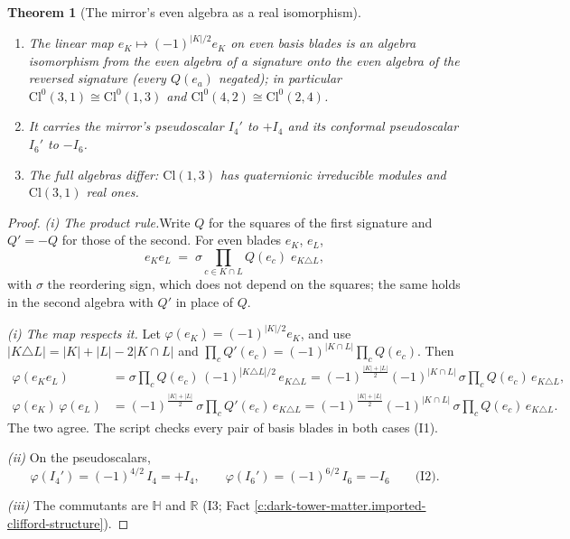 \documentclass[11pt]{article}
\newtheorem{theorem}{Theorem}[section]
\theoremstyle{definition}
\theoremstyle{plain}
\newcommand{\changedmark}[2]{\marginpar{\raggedright\scriptsize\color{#1}#2}}
\providecommand{\Cl}{}\renewcommand{\Cl}{\mathrm{Cl}}
\providecommand{\HH}{}\renewcommand{\HH}{\mathbb{H}}
\providecommand{\R}{}\renewcommand{\R}{\mathbb{R}}
\begin{document}
\begin{theorem}[The mirror's even algebra as a real isomorphism]\label{c:dark-tower-matter.mirror-algebra}
\changedmark{BurntOrange}{changed since the deposit}
\begin{enumerate}
\item[(i)] The linear map $e_{K} \mapsto (-1)^{|K|/2}e_{K}$ on even basis blades is an algebra isomorphism from the even algebra of a signature onto the even algebra of the reversed signature (every $Q(e_{a})$ negated); in particular $\Cl^{0}(3,1) \cong \Cl^{0}(1,3)$ and $\Cl^{0}(4,2) \cong \Cl^{0}(2,4)$.
\item[(ii)] It carries the mirror's pseudoscalar $I_{4}'$ to $+I_{4}$ and its conformal pseudoscalar $I_{6}'$ to $-I_{6}$.
\item[(iii)] The full algebras differ: $\Cl(1,3)$ has quaternionic irreducible modules and $\Cl(3,1)$ real ones.
\end{enumerate}
\end{theorem}
\begin{proof}
\textit{(i) The product rule.}\enspace Write $Q$ for the squares of the first signature and $Q' = -Q$ for those of the second. For even blades $e_{K}$, $e_{L}$,
\[
e_{K}e_{L} \;=\; \sigma \prod_{c \in K \cap L}Q(e_{c})\;e_{K \triangle L},
\]
with $\sigma$ the reordering sign, which does not depend on the squares; the same holds in the second algebra with $Q'$ in place of $Q$.



\emph{(i) The map respects it.}  Let $\varphi(e_{K}) = (-1)^{|K|/2}e_{K}$, and use $|K \triangle L| = |K| + |L| - 2|K \cap L|$ and $\prod_{c}Q'(e_{c}) = (-1)^{|K \cap L|}\prod_{c}Q(e_{c})$. Then
\begin{align*}
\varphi(e_{K}e_{L}) &= \sigma\prod_{c}Q(e_{c})\,(-1)^{|K \triangle L|/2}\,e_{K \triangle L}
= (-1)^{\frac{|K|+|L|}{2}}(-1)^{|K \cap L|}\,\sigma\prod_{c}Q(e_{c})\,e_{K \triangle L}, \\
\varphi(e_{K})\,\varphi(e_{L}) &= (-1)^{\frac{|K|+|L|}{2}}\,\sigma\prod_{c}Q'(e_{c})\,e_{K \triangle L}
= (-1)^{\frac{|K|+|L|}{2}}(-1)^{|K \cap L|}\,\sigma\prod_{c}Q(e_{c})\,e_{K \triangle L}.
\end{align*}
The two agree. The script checks every pair of basis blades in both cases (I1).



\emph{(ii)}  On the pseudoscalars,
\[
\varphi(I_{4}') = (-1)^{4/2}\,I_{4} = +I_{4}, \qquad \varphi(I_{6}') = (-1)^{6/2}\,I_{6} = -I_{6} \qquad \text{(I2)}.
\]



\emph{(iii)}  The commutants are $\HH$ and $\R$ (I3; Fact \ref{c:dark-tower-matter.imported-clifford-structure}).

\end{proof}
\end{document}
